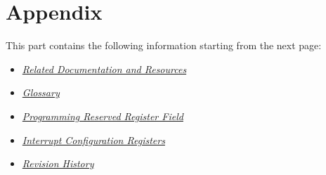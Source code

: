 \documentclass[openany, 10pt]{book}
\begin{document}






\part{Appendix}\label{appendix}

This part contains the following information starting from the next page:

\begin{itemize}
    \item \hyperref[sec:resources]{\textit{Related Documentation and Resources}}
    \item \hyperref[glossary]{\textit{Glossary}}
    \item \hyperref[programming-reserved-field]{\textit{Programming Reserved Register Field}}
    \item \hyperref[interrupt-config-registers]{\textit{Interrupt Configuration Registers}}
    \item \hyperref[revision-history]{\textit{Revision History}}
\end{itemize}



\clearpage


\clearpage


\clearpage


\clearpage


\clearpage


\clearpage

\end{document}
